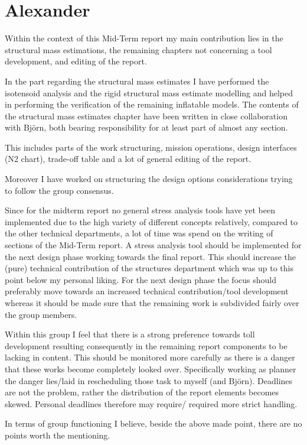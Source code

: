 \section{Alexander}

Within the context of this Mid-Term report my main contribution lies in the structural mass estimations, the remaining chapters not concerning a tool development, and editing of the report.

In the part regarding the structural mass estimates I have performed the isotensoid analysis and the rigid structural mass estimate modelling and helped in performing the verification of the remaining inflatable models.  The contents of the structural mass estimates chapter have been written in close collaboration with Björn, both bearing responsibility for at least part of almost any section.

This includes parts of the work structuring, mission operations, design interfaces (N2 chart), trade-off table and a lot of general editing of the report.

Moreover I have worked on structuring the design options considerations trying to follow the group consensus.

Since for the midterm report no general stress analysis tools have yet been implemented due to the high variety of different concepts relatively, compared to the other technical departments, a lot of time was spend on the writing of sections of the Mid-Term report.  A stress analysis tool should be implemented for the next design phase working towards the final report. This should increase the (pure) technical contribution of the structures department which was up to this point below my personal liking. For the next design phase the focus should preferably move towards an increased technical contribution/tool development whereas it should be made sure that the remaining work is subdivided fairly over the group members.

Within this group I feel that there is a strong preference towards toll development resulting consequently in the remaining report components to be lacking in content. This should be monitored more carefully as there is a danger that these works become completely looked over. Specifically working as planner the danger lies/laid in rescheduling those task to myself (and Björn). Deadlines are not the problem, rather the distribution of the report elements becomes skewed. Personal deadlines therefore may require/ required more strict handling. 

In terms of group functioning I believe, beside the above made point, there are no points worth the mentioning. 
 
